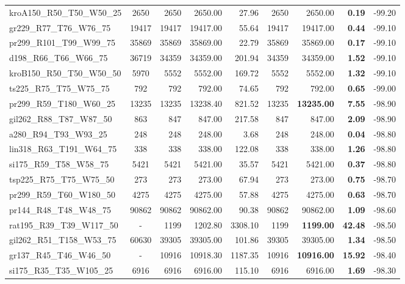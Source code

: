 \documentclass{ro}
\begin{document}
\begin{table}[!ht]
{\begin{tabular}{lcrrrrrrr}
kroA150\_R50\_T50\_W50\_25 & 2650 & 2650 & 2650.00 & 27.96 & 2650 & 2650.00 & \textbf{0.19} & -99.20 \\
gr229\_R77\_T76\_W76\_75 & 19417 & 19417 & 19417.00 & 55.64 & 19417 & 19417.00 & \textbf{0.44} & -99.10 \\
pr299\_R101\_T99\_W99\_75 & 35869 & 35869 & 35869.00 & 22.79 & 35869 & 35869.00 & \textbf{0.17} & -99.10 \\
d198\_R66\_T66\_W66\_75 & 36719 & 34359 & 34359.00 & 201.94 & 34359 & 34359.00 & \textbf{1.52} & -99.10 \\
kroB150\_R50\_T50\_W50\_50 & 5970 & 5552 & 5552.00 & 169.72 & 5552 & 5552.00 & \textbf{1.32} & -99.10 \\
ts225\_R75\_T75\_W75\_75 & 792 & 792 & 792.00 & 74.65 & 792 & 792.00 & \textbf{0.65} & -99.00 \\
pr299\_R59\_T180\_W60\_25 & 13235 & 13235 & 13238.40 & 821.52 & 13235 & \textbf{13235.00} & \textbf{7.55} & -98.90 \\
gil262\_R88\_T87\_W87\_50 & 863 & 847 & 847.00 & 217.58 & 847 & 847.00 & \textbf{2.09} & -98.90 \\
a280\_R94\_T93\_W93\_25 & 248 & 248 & 248.00 & 3.68 & 248 & 248.00 & \textbf{0.04} & -98.80 \\
lin318\_R63\_T191\_W64\_75 & 338 & 338 & 338.00 & 122.08 & 338 & 338.00 & \textbf{1.26} & -98.80 \\
si175\_R59\_T58\_W58\_75 & 5421 & 5421 & 5421.00 & 35.57 & 5421 & 5421.00 & \textbf{0.37} & -98.80 \\
tsp225\_R75\_T75\_W75\_50 & 273 & 273 & 273.00 & 67.94 & 273 & 273.00 & \textbf{0.75} & -98.70 \\
pr299\_R59\_T60\_W180\_50 & 4275 & 4275 & 4275.00 & 57.88 & 4275 & 4275.00 & \textbf{0.63} & -98.70 \\
pr144\_R48\_T48\_W48\_75 & 90862 & 90862 & 90862.00 & 90.38 & 90862 & 90862.00 & \textbf{1.09} & -98.60 \\
rat195\_R39\_T39\_W117\_50 & - & 1199 & 1202.80 & 3308.10 & 1199 & \textbf{1199.00} & \textbf{42.48} & -98.50 \\
gil262\_R51\_T158\_W53\_75 & 60630 & 39305 & 39305.00 & 101.86 & 39305 & 39305.00 & \textbf{1.34} & -98.50 \\
gr137\_R45\_T46\_W46\_50 & - & 10916 & 10918.30 & 1187.35 & 10916 & \textbf{10916.00} & \textbf{15.92} & -98.40 \\
si175\_R35\_T35\_W105\_25 & 6916 & 6916 & 6916.00 & 115.10 & 6916 & 6916.00 & \textbf{1.69} & -98.30 \\

\end{tabular}}
\end{table}
\end{document}
